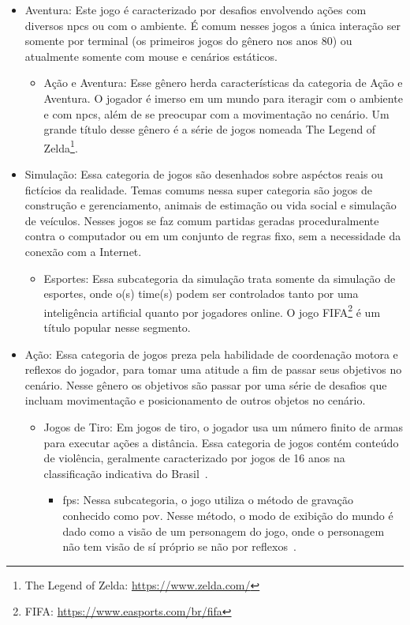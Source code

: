 \begin{itemize}
\begin{itemize}
    \end{itemize}
  \item Aventura: Este jogo é caracterizado por desafios envolvendo ações com diversos \ac{npcs} ou com o ambiente. É comum nesses jogos a única interação ser somente por terminal (os primeiros jogos do gênero nos anos 80) ou atualmente somente com mouse e cenários estáticos.
    \begin{itemize}
      \item Ação e Aventura: Esse gênero herda características da categoria de Ação e Aventura. O jogador é imerso em um mundo para iteragir com o ambiente e com \ac{npcs}, além de se preocupar com a movimentação no cenário. Um grande título desse gênero é a série de jogos nomeada The Legend of Zelda\footnote{The Legend of Zelda: \url{https://www.zelda.com/}}.
    \end{itemize}
  \item Simulação: Essa categoria de jogos são desenhados sobre aspéctos reais ou fictícios da realidade. Temas comums nessa super categoria são jogos de construção e gerenciamento, animais de estimação ou vida social e simulação de veículos. Nesses jogos se faz comum partidas geradas proceduralmente contra o computador ou em um conjunto de regras fixo, sem a necessidade da conexão com a Internet.
    \begin{itemize}
      \item Esportes: Essa subcategoria da simulação trata somente da simulação de esportes, onde o(s) time(s) podem ser controlados tanto por uma inteligência artificial quanto por jogadores online. O jogo FIFA\footnote{FIFA: \url{https://www.easports.com/br/fifa}} é um título popular nesse segmento.
    \end{itemize}
  \item Ação: Essa categoria de jogos preza pela habilidade de coordenação motora e reflexos do jogador, para tomar uma atitude a fim de passar seus objetivos no cenário. Nesse gênero os objetivos são passar por uma série de desafios que incluam movimentação e posicionamento de outros objetos no cenário.
    \begin{itemize}
      \item Jogos de Tiro: Em jogos de tiro, o jogador usa um número finito de armas para executar ações a distância. Essa categoria de jogos contém conteúdo de violência, geralmente caracterizado por jogos de 16 anos na classificação indicativa do Brasil~\cite{trindade2018Apr}.
        \begin{itemize}
          \item \ac{fps}: Nessa subcategoria, o jogo utiliza o método de gravação conhecido como \ac{pov}. Nesse método, o modo de exibição do mundo é dado como a visão de um personagem do jogo, onde o personagem não tem visão de sí próprio se não por reflexos~\cite{video_game_technologies}.

\end{itemize}
\end{itemize}
\end{itemize}

